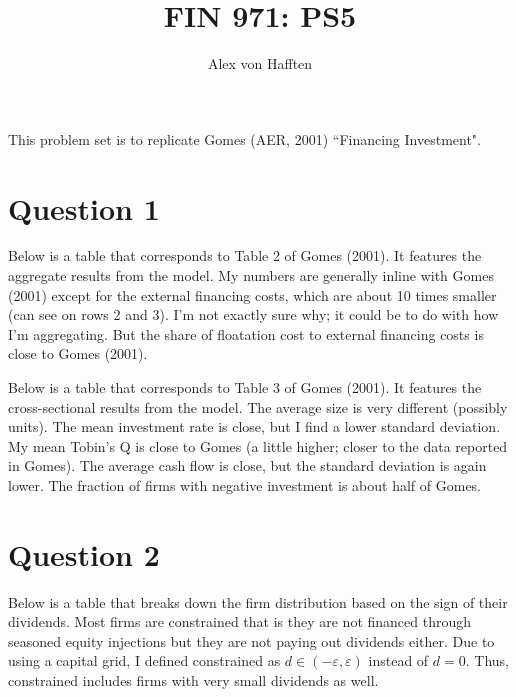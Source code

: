\documentclass{article}
\title{FIN 971: PS5}
\author{Alex von Hafften}
\begin{document}
\maketitle

This problem set is to replicate Gomes (AER, 2001) ``Financing Investment".

\section*{Question 1}

Below is a table that corresponds to Table 2 of Gomes (2001).  It features the aggregate results from the model. My numbers are generally inline with Gomes (2001) except for the external financing costs, which are about 10 times smaller (can see on rows 2 and 3).  I'm not exactly sure why; it could be to do  with how I'm aggregating.  But the share of floatation cost to external financing costs is close to Gomes (2001).

\bigskip


\bigskip

Below is a table that corresponds to Table 3 of Gomes (2001). It features the cross-sectional results from the model.  The average size is very different (possibly units).  The mean investment rate is close, but I find a lower standard deviation.  My mean Tobin's Q is close to Gomes (a little higher; closer to the data reported in Gomes).  The average cash flow is close, but the standard deviation is again lower.  The fraction of firms with negative investment is about half of Gomes.

\bigskip


\section*{Question 2}

Below is a table that breaks down the firm distribution based on the sign of their dividends.  Most firms are constrained that is they are not financed through seasoned equity injections but they are not paying out dividends either.  Due to using a capital grid, I defined constrained as $d \in (-\varepsilon, \varepsilon)$ instead of $d = 0$.  Thus, constrained includes firms with very small dividends as well.

\bigskip

\end{document}
